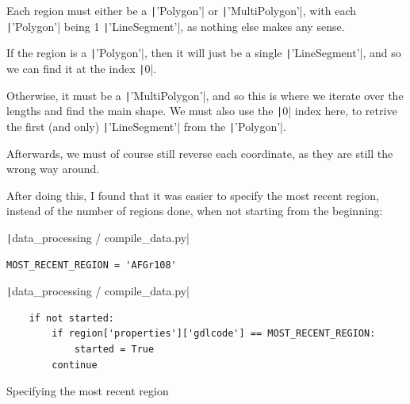 \documentclass[12pt]{report}
\newcommand{\pil}[1]{\protect\texttt|#1|}
\begin{document}
Each region must either be a \pil{'Polygon'} or \pil{'MultiPolygon'}, with each \pil{'Polygon'} being 1 \pil{'LineSegment'}, as nothing else makes any sense.

If the region is a \pil{'Polygon'}, then it will just be a single \pil{'LineSegment'}, and so we can find it at the index \pil{0}.

Otherwise, it must be a \pil{'MultiPolygon'}, and so this is where we iterate over the lengths and find the main shape. We must also use the \pil{0} index here, to retrive the first (and only) \pil{'LineSegment'} from the \pil{'Polygon'}.

Afterwards, we must of course still reverse each coordinate, as they are still the wrong way around.

\begin{center}
\end{center}

After doing this, I found that it was easier to specify the most recent region, instead of the number of regions done, when not starting from the beginning:

\begin{listing}[H]
\pil{data_processing / compile_data.py}
\begin{verbatim}
MOST_RECENT_REGION = 'AFGr108'
\end{verbatim}
\pil{data_processing / compile_data.py}
\begin{verbatim}
    if not started: 
        if region['properties']['gdlcode'] == MOST_RECENT_REGION:
            started = True
        continue
\end{verbatim}
\caption{Specifying the most recent region}\label{cs:specifyMostRecentRegion}
\end{listing}
\end{document}
